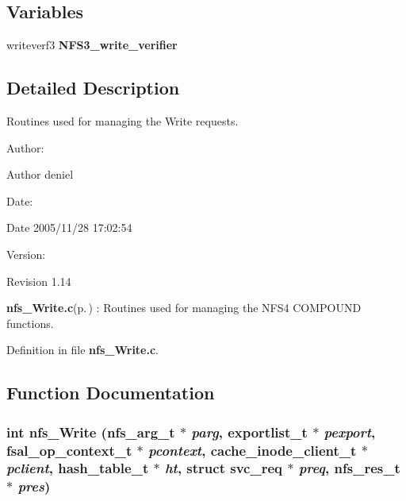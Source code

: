\subsection*{Variables}
\begin{CompactItemize}
\item 
writeverf3 {\bf NFS3\_\-write\_\-verifier}
\end{CompactItemize}


\subsection{Detailed Description}
Routines used for managing the Write requests. 

\begin{Desc}
\item[Author:]\begin{Desc}
\item[Author]deniel \end{Desc}
\end{Desc}
\begin{Desc}
\item[Date:]\begin{Desc}
\item[Date]2005/11/28 17:02:54 \end{Desc}
\end{Desc}
\begin{Desc}
\item[Version:]\begin{Desc}
\item[Revision]1.14 \end{Desc}
\end{Desc}
{\bf nfs\_\-Write.c}{\rm (p.\,\pageref{nfs__Write_8c})} : Routines used for managing the NFS4 COMPOUND functions.

Definition in file {\bf nfs\_\-Write.c}.

\subsection{Function Documentation}
\subsubsection{\setlength{\rightskip}{0pt plus 5cm}int nfs\_\-Write (nfs\_\-arg\_\-t $\ast$ {\em parg}, exportlist\_\-t $\ast$ {\em pexport}, fsal\_\-op\_\-context\_\-t $\ast$ {\em pcontext}, cache\_\-inode\_\-client\_\-t $\ast$ {\em pclient}, hash\_\-table\_\-t $\ast$ {\em ht}, struct svc\_\-req $\ast$ {\em preq}, nfs\_\-res\_\-t $\ast$ {\em pres})}\label{nfs__Write_8c_a1}




